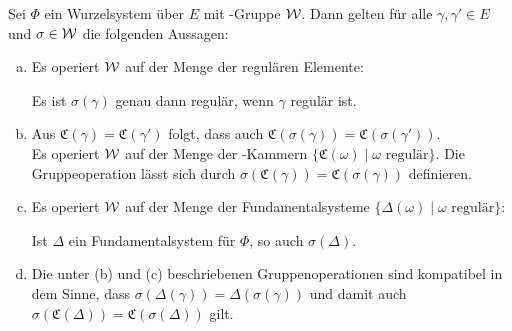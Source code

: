 \begin{prop}
  \label{prop:groupOp}
  Sei $\Phi$ ein Wurzelsystem über $E$ mit \weyl\hyp{}Gruppe $\mathcal{W}$.
  Dann gelten für alle $\gamma, \gamma' \in E$ und $\sigma \in \mathcal{W}$ die folgenden Aussagen:
  \begin{enumerate}[(a)]
    \item Es operiert $\mathcal{W}$ auf der Menge der regulären Elemente: 
      \begin{addmargin}[2em]{2em}
        Es ist $\sigma(\gamma)$ genau dann regulär, wenn $\gamma$ regulär ist.
      \end{addmargin}
      
    \item Aus $\mathfrak{C}(\gamma) = \mathfrak{C}(\gamma')$ folgt, dass auch $\mathfrak{C}(\sigma(\gamma)) = \mathfrak{C}(\sigma(\gamma'))$. \\
      Es operiert $\mathcal{W}$ auf der Menge der \weyl\hyp{}Kammern $\{\mathfrak{C}(\omega) \mid \omega \text{ regulär}\}$. Die Gruppeoperation lässt sich durch $ \sigma(\mathfrak{C}(\gamma)) = \mathfrak{C}(\sigma(\gamma))$ definieren.

    \item Es operiert $\mathcal{W}$ auf der Menge der Fundamentalsysteme $\{\Delta(\omega) \mid \omega \text{ regulär}\}$: 
      \begin{addmargin}[2em]{2em}
        Ist $\Delta$ ein Fundamentalsystem für $\Phi$, so auch $\sigma(\Delta)$. 
      \end{addmargin}

    \item Die unter (b) und (c) beschriebenen Gruppenoperationen sind kompatibel in dem Sinne, dass 
      $\sigma(\Delta(\gamma)) = \Delta(\sigma(\gamma))$
      und damit auch
      $\sigma(\mathfrak{C}(\Delta)) = \mathfrak{C}(\sigma(\Delta))$
      gilt.
  \end{enumerate}
\end{prop}

